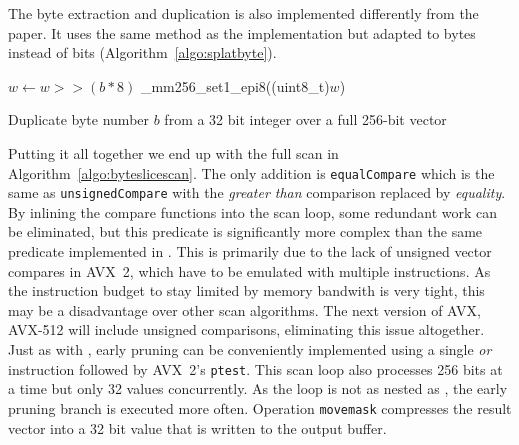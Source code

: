 The byte extraction and duplication is also implemented differently from the
paper. It uses the same method as the \bwv{} implementation but adapted to bytes
instead of bits (Algorithm~\ref{algo:splatbyte}).

\begin{algorithm}[h]
\begin{algorithmic}[1]
  \State $w \gets w >> (b * 8)$ 
  \State \Return \_mm256\_set1\_epi8((uint8\_t)$w$) 
  \EndProcedure
\end{algorithmic}
\caption{Duplicate byte number $b$ from a 32 bit integer over a full 256-bit vector}
\label{algo:splatbyte}
\end{algorithm}

Putting it all together we end up with the full scan in
Algorithm~\ref{algo:byteslicescan}. The only addition is \texttt{equalCompare}
which is the same as \texttt{unsignedCompare} with the \emph{greater than}
comparison replaced by \emph{equality}. By inlining the compare functions into
the scan loop, some redundant work can be eliminated, but this predicate is
significantly more complex than the same predicate implemented in \bwv{}. This
is primarily due to the lack of unsigned vector compares in AVX~2, which have to
be emulated with multiple instructions. As the instruction budget to stay
limited by memory bandwith is very tight, this may be a disadvantage over other
scan algorithms.  The next version of AVX, AVX-512 will include unsigned
comparisons, eliminating this issue altogether. Just as with \bwv{}, early
pruning can be conveniently implemented using a single \emph{or} instruction
followed by AVX~2's \texttt{ptest}.  This scan loop also processes 256 bits at a
time but only 32 values concurrently. As the loop is not as nested as \bwv{},
the early pruning branch is executed more often. Operation \texttt{movemask}
compresses the result vector into a 32 bit value that is written to the output
buffer.

